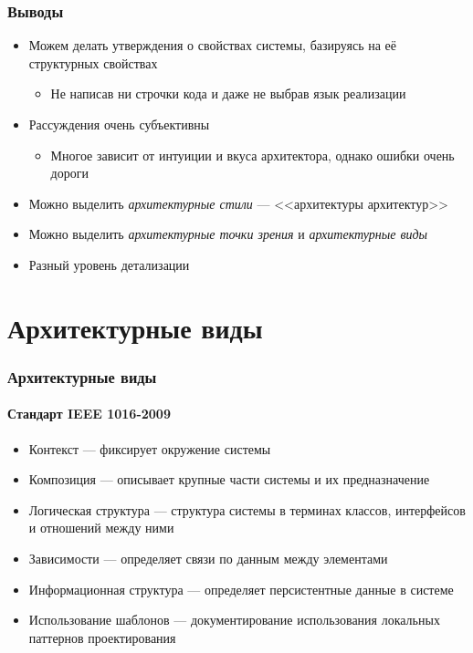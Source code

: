 \documentclass{../slides-style}
\begin{document}
    \begin{frame}
        \frametitle{Выводы}
        \begin{itemize}
            \item Можем делать утверждения о свойствах системы, базируясь на её структурных свойствах
            \begin{itemize}
                \item Не написав ни строчки кода и даже не выбрав язык реализации
            \end{itemize}
            \item Рассуждения очень субъективны
            \begin{itemize}
                \item Многое зависит от интуиции и вкуса архитектора, однако ошибки очень дороги
            \end{itemize}
            \item Можно выделить \emph{архитектурные стили} --- <<архитектуры архитектур>>
            \item Можно выделить \emph{архитектурные точки зрения} и \emph{архитектурные виды}
            \item Разный уровень детализации
        \end{itemize}
    \end{frame}

    \section{Архитектурные виды}

    \begin{frame}
        \frametitle{Архитектурные виды}
        \framesubtitle{Стандарт IEEE 1016-2009}
        \begin{itemize}
            \item Контекст --- фиксирует окружение системы
            \item Композиция --- описывает крупные части системы и их предназначение
            \item Логическая структура --- структура системы в терминах классов, интерфейсов и отношений между ними
            \item Зависимости --- определяет связи по данным между элементами
            \item Информационная структура --- определяет персистентные данные в системе
            \item Использование шаблонов --- документирование использования локальных паттернов проектирования
        \end{itemize}
    \end{frame}
\end{document}
